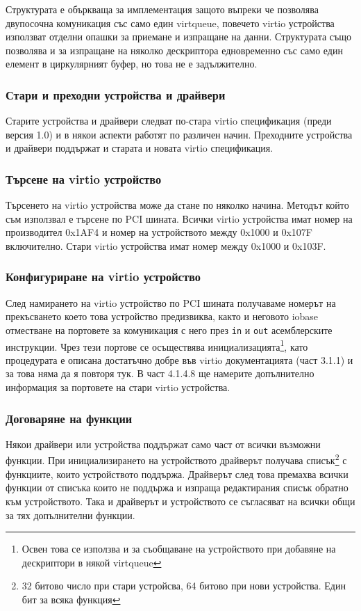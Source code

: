 Структурата е объркваща за имплементация защото въпреки че позволява двупосочна комуникация със само един virtqueue, повечето virtio устройства използват отделни опашки за приемане и изпращане на данни. Структурата също позволява и за изпращане на няколко дескриптора едновременно със само един елемент в циркулярният буфер, но това не е задължително.

\subsubsection{Стари и преходни устройства и драйвери}
Старите устройства и драйвери следват по-стара virtio спецификация (преди версия 1.0) и в някои аспекти работят по различен начин. Преходните устройства и драйвери поддържат и старата и новата virtio спецификация.

\subsubsection{Търсене на virtio устройство}
Търсенето на virtio устройства може да стане по няколко начина. Методът който съм използвал е търсене по PCI шината. Всички virtio устройства имат номер на производител 0x1AF4 и номер на устройството между 0x1000 и 0x107F включително. Стари virtio устройства имат номер между 0x1000 и 0x103F.

\subsubsection{Конфигуриране на virtio устройство}
След намирането на virtio устройство по PCI шината получаваме номерът на прекъсването което това устройство предизвиква, както и неговото iobase отместване на портовете за комуникация с него през {\tt in} и {\tt out} асемблерските инструкции. Чрез тези портове се осъществява инициализацията\footnote{Освен това се използва и за съобщаване на устройството при добавяне на дескриптори в някой virtqueue}, като процедурата е описана достатъчно добре във virtio документацията\parencite{virtiodocs} (част 3.1.1) и за това няма да я повторя тук. В част 4.1.4.8 ще намерите допълнително информация за портовете на стари virtio устройства.

\subsubsection{Договаряне на функции}
Някои драйвери или устройства поддържат само част от всички възможни функции. При инициализирането на устройството драйверът получава списък\footnote{32 битово число при стари устройсва, 64 битово при нови устройства. Един бит за всяка функция} с функциите, които устройството поддържа. Драйверът след това премахва всички функции от списъка които не поддържа и изпраща редактирания списък обратно към устройството. Така и драйверът и устройството се съгласяват на всички общи за тях допълнителни функции.

